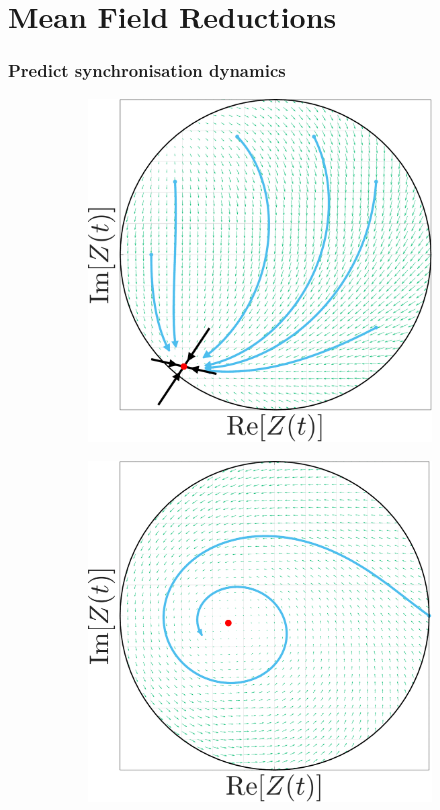 \section{Mean Field Reductions}
\begin{frame}
\frametitle{Predict synchronisation dynamics}
\begin{figure}[H]
\centering
\begin{subfigure}[b]{0.32\linewidth}
   \centering
  \includegraphics[width=\linewidth]{../Figures/PhaseSpace/MFRPSR.pdf}
   \label{fig:MFRPSR} 
\end{subfigure} \hfill
\begin{subfigure}[b]{0.32\linewidth}
   \centering
  \includegraphics[width=\linewidth]{../Figures/PhaseSpace/MFRPSS.pdf}

\end{subfigure}
\end{figure}
\end{frame}
